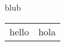 \documentclass[10pt,a4paper]{report}
\begin{document}
blub
\begin{tabular}{|l|p{3cm}|}
hello & hola
\end{tabular}
\end{document}
